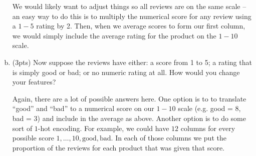 \documentclass[10pt]{article}
\begin{document}
\begin{enumerate}[(a)]
		\color{blue}
	We would likely want to adjust things so all reviews are on the same scale -- an easy way to do this is to multiply the numerical score for any review using a $1-5$ rating by 2. Then, when we average scores  to form our  first column, we would simply include the average rating for the product on the $1-10$ scale.
	\color{black}
	
	\item  (3pts) Now suppose the reviews have either:  a score from 1 to 5;  a rating that is simply good or bad; or no numeric rating at all. How would you change your features?
		\color{blue}
		
	Again, there are a lot of possible answers here. One option is to to translate ``good'' and ``bad'' to a numerical score on our $1-10$ scale (e.g. good = 8, bad = 3) and include in the average as above.
	Another option is to do some sort of $1$-hot encoding. For example, we could have $12$ columns for every possible score $1,\ldots, 10, \text{good}, \text{bad}$. In each of those columns we put the proportion of the reviews for each product that was given that score.
		\color{black}
\end{enumerate}

\newpage
\end{document}
